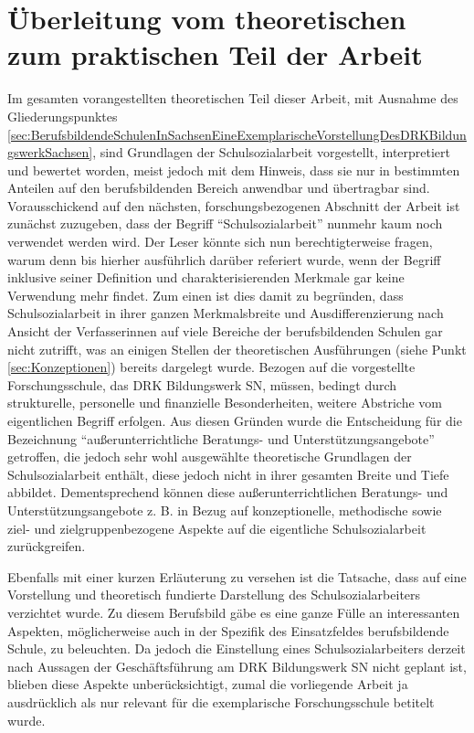 \section{Überleitung vom theoretischen zum praktischen Teil der Arbeit}
\label{sec:ÜberleitungVomTheoretischenZumPraktischenTeilDerArbeit}

Im gesamten vorangestellten theoretischen Teil dieser Arbeit, mit Ausnahme des Gliederungspunktes \ref{sec:BerufsbildendeSchulenInSachsenEineExemplarischeVorstellungDesDRKBildungswerkSachsen}, sind Grundlagen der Schulsozialarbeit vorgestellt, interpretiert und bewertet worden, meist jedoch mit dem Hinweis, dass sie nur in bestimmten Anteilen auf den berufsbildenden Bereich anwendbar und übertragbar sind. Vorausschickend auf den nächsten, forschungsbezogenen Abschnitt der Arbeit ist zunächst zuzugeben, dass der Begriff "`Schulsozialarbeit"' nunmehr kaum noch verwendet werden wird. Der Leser könnte sich nun berechtigterweise fragen, warum denn bis hierher ausführlich darüber referiert wurde, wenn der Begriff inklusive seiner Definition und charakterisierenden Merkmale gar keine Verwendung mehr findet. Zum einen ist dies damit zu begründen, dass Schulsozialarbeit in ihrer ganzen Merkmalsbreite und Ausdifferenzierung nach Ansicht der Verfasserinnen auf viele Bereiche der berufsbildenden Schulen gar nicht zutrifft, was an einigen Stellen der theoretischen Ausführungen (siehe Punkt \ref{sec:Konzeptionen}) bereits dargelegt wurde. Bezogen auf die vorgestellte Forschungsschule, das DRK Bildungswerk SN, müssen, bedingt durch strukturelle, personelle und finanzielle Besonderheiten, weitere Abstriche vom eigentlichen Begriff erfolgen. Aus diesen Gründen wurde die Entscheidung für die Bezeichnung "`außerunterrichtliche Beratungs- und Unterstützungsangebote"' getroffen, die jedoch sehr wohl ausgewählte theoretische Grundlagen der Schulsozialarbeit enthält, diese jedoch nicht in ihrer gesamten Breite und Tiefe abbildet. Dementsprechend können diese außerunterrichtlichen Beratungs- und Unterstützungsangebote z. B. in Bezug auf konzeptionelle, methodische sowie ziel- und zielgruppenbezogene Aspekte auf die eigentliche Schulsozialarbeit zurückgreifen. 

Ebenfalls mit einer kurzen Erläuterung zu versehen ist die Tatsache, dass auf eine Vorstellung und theoretisch fundierte Darstellung des Schulsozialarbeiters verzichtet wurde. Zu diesem Berufsbild gäbe es eine ganze Fülle an interessanten Aspekten, möglicherweise auch in der Spezifik des Einsatzfeldes berufsbildende Schule, zu beleuchten. Da jedoch die Einstellung eines Schulsozialarbeiters derzeit nach Aussagen der Geschäftsführung am DRK Bildungswerk SN nicht geplant ist, blieben diese Aspekte unberücksichtigt, zumal die vorliegende Arbeit ja ausdrücklich als nur relevant für die exemplarische Forschungsschule betitelt wurde.


